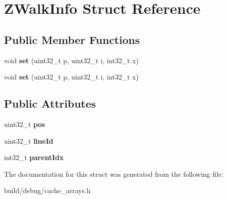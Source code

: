 \hypertarget{structZWalkInfo}{\section{Z\-Walk\-Info Struct Reference}
\label{structZWalkInfo}
}
\subsection*{Public Member Functions}
\begin{DoxyCompactItemize}
\item 
\hypertarget{structZWalkInfo_a44eda449e523dc1b3a48a413918b2d3b}{void {\bfseries set} (uint32\-\_\-t p, uint32\-\_\-t i, int32\-\_\-t x)}\label{structZWalkInfo_a44eda449e523dc1b3a48a413918b2d3b}

\item 
\hypertarget{structZWalkInfo_a44eda449e523dc1b3a48a413918b2d3b}{void {\bfseries set} (uint32\-\_\-t p, uint32\-\_\-t i, int32\-\_\-t x)}\label{structZWalkInfo_a44eda449e523dc1b3a48a413918b2d3b}

\end{DoxyCompactItemize}
\subsection*{Public Attributes}
\begin{DoxyCompactItemize}
\item 
\hypertarget{structZWalkInfo_acbfb8147f815605e0e3580fa92a3a187}{uint32\-\_\-t {\bfseries pos}}\label{structZWalkInfo_acbfb8147f815605e0e3580fa92a3a187}

\item 
\hypertarget{structZWalkInfo_af0dfc727049902878bfcedab409c7a98}{uint32\-\_\-t {\bfseries line\-Id}}\label{structZWalkInfo_af0dfc727049902878bfcedab409c7a98}

\item 
\hypertarget{structZWalkInfo_a2514b51301f4964200344fdd55a747d0}{int32\-\_\-t {\bfseries parent\-Idx}}\label{structZWalkInfo_a2514b51301f4964200344fdd55a747d0}

\end{DoxyCompactItemize}


The documentation for this struct was generated from the following file\-:\begin{DoxyCompactItemize}
\item 
build/debug/cache\-\_\-arrays.\-h\end{DoxyCompactItemize}
